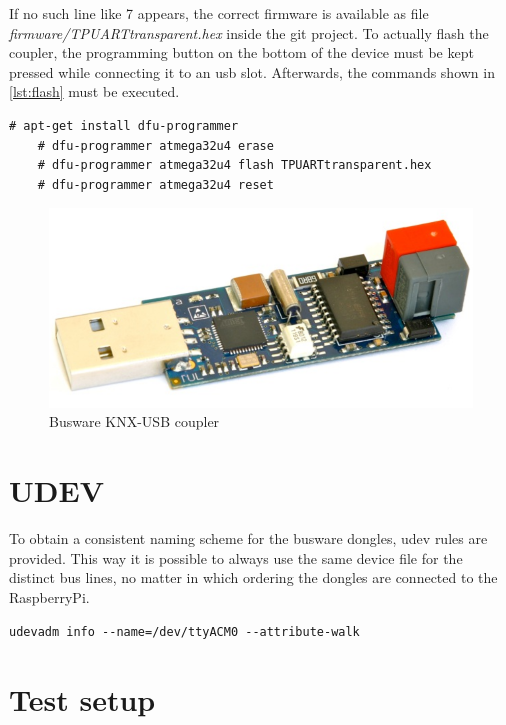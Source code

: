 If no such line like 7 appears, the correct firmware is available as file \textit{firmware/TPUARTtransparent.hex} inside the git project. To actually flash the 
coupler, the programming button on the bottom of the device must be kept pressed while connecting it to an \gls{usb} slot. Afterwards, the commands shown
in \ref{lst:flash} must be executed.

\begin{lstlisting}[style=BashInputStyle,label=lst:flash]
    # apt-get install dfu-programmer
    # dfu-programmer atmega32u4 erase
    # dfu-programmer atmega32u4 flash TPUARTtransparent.hex
    # dfu-programmer atmega32u4 reset
\end{lstlisting}


\begin{figure}
    \centering
    \caption{Busware KNX-USB coupler}
    \label{fig:busware}
\includegraphics[scale=0.2]{figures/busware.png}
\end{figure}

\section{UDEV}

To obtain a consistent naming scheme for the busware dongles, udev rules are provided. This way it is possible to always use the same
device file for the distinct bus lines, no matter in which ordering the dongles are connected to the RaspberryPi.

\begin{lstlisting}[style=BashInputStyle,label=lst:udev]
  udevadm info --name=/dev/ttyACM0 --attribute-walk
\end{lstlisting}

\section{Test setup}

